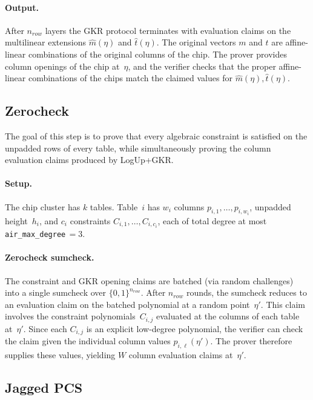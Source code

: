 \documentclass[11pt]{article}
\begin{document}
\paragraph{Output.}
After $n_{row}$ layers the GKR protocol terminates with evaluation claims on the multilinear extensions
$\hat{m}(\eta)$ and $\hat{t}(\eta)$.
The original vectors $m$ and $t$ are affine-linear combinations of the original columns of the chip.
The prover provides column openings of the chip at~$\eta$, and the verifier checks that the proper affine-linear combinations
of the chips match the claimed values for $\hat{m}(\eta), \hat{t}(\eta)$.

\subsection{Zerocheck}\label{sec:zerocheck}

The goal of this step is to prove that every algebraic constraint is
satisfied on the unpadded rows of every table, while simultaneously
proving the column evaluation claims produced by LogUp+GKR.

\paragraph{Setup.}
The chip cluster has $k$ tables.
Table~$i$ has $w_i$ columns
$p_{i,1},\ldots,p_{i,w_i}$, unpadded height~$h_i$,
and $c_i$ constraints $C_{i,1},\ldots,C_{i,c_i}$, each of total degree at
most \texttt{air\_max\_degree}$\,=3$.

\paragraph{Zerocheck sumcheck.}
The constraint and GKR opening claims are batched (via random challenges)
into a single sumcheck over $\{0,1\}^{n_{row}}$.
After $n_{row}$ rounds, the sumcheck reduces to an evaluation claim
on the batched polynomial at a random point~$\eta'$.
This claim involves the constraint polynomials~$C_{i,j}$ evaluated at
the columns of each table at~$\eta'$.
Since each $C_{i,j}$ is an explicit low-degree polynomial,
the verifier can check the claim given the individual column values
$p_{i,\ell}(\eta')$.
The prover therefore supplies these values, yielding
$W$ column evaluation claims at~$\eta'$.

\subsection{Jagged PCS}\label{sec:jagged}
\end{document}
